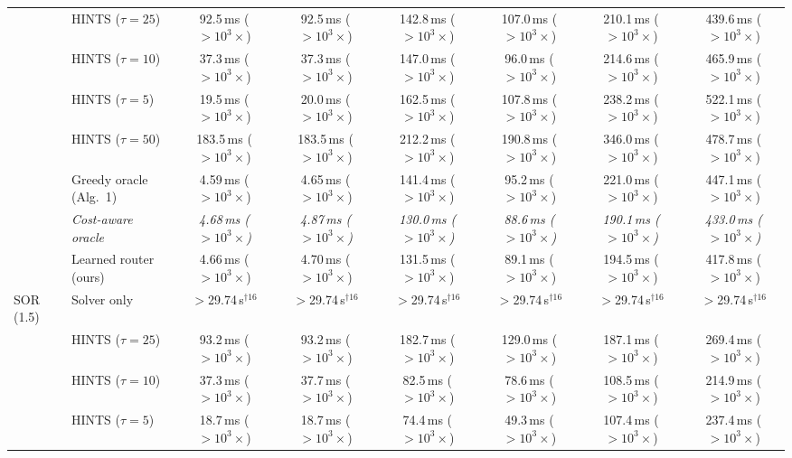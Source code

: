 {\begin{tabular}{llcccccc}
 & HINTS ($\tau{=}25$) & 92.5\,ms ($>10^{3}\times$) & 92.5\,ms ($>10^{3}\times$) & 142.8\,ms ($>10^{3}\times$) & 107.0\,ms ($>10^{3}\times$) & 210.1\,ms ($>10^{3}\times$) & 439.6\,ms ($>10^{3}\times$) \\
 & HINTS ($\tau{=}10$) & 37.3\,ms ($>10^{3}\times$) & 37.3\,ms ($>10^{3}\times$) & 147.0\,ms ($>10^{3}\times$) & 96.0\,ms ($>10^{3}\times$) & 214.6\,ms ($>10^{3}\times$) & 465.9\,ms ($>10^{3}\times$) \\
 & HINTS ($\tau{=}5$) & 19.5\,ms ($>10^{3}\times$) & 20.0\,ms ($>10^{3}\times$) & 162.5\,ms ($>10^{3}\times$) & 107.8\,ms ($>10^{3}\times$) & 238.2\,ms ($>10^{3}\times$) & 522.1\,ms ($>10^{3}\times$) \\
 & HINTS ($\tau{=}50$) & 183.5\,ms ($>10^{3}\times$) & 183.5\,ms ($>10^{3}\times$) & 212.2\,ms ($>10^{3}\times$) & 190.8\,ms ($>10^{3}\times$) & 346.0\,ms ($>10^{3}\times$) & 478.7\,ms ($>10^{3}\times$) \\
 & Greedy oracle (Alg.~1) & 4.59\,ms ($>10^{3}\times$) & 4.65\,ms ($>10^{3}\times$) & 141.4\,ms ($>10^{3}\times$) & 95.2\,ms ($>10^{3}\times$) & 221.0\,ms ($>10^{3}\times$) & 447.1\,ms ($>10^{3}\times$) \\
 & \textit{Cost-aware oracle} & \textit{4.68\,ms ($>10^{3}\times$)} & \textit{4.87\,ms ($>10^{3}\times$)} & \textit{130.0\,ms ($>10^{3}\times$)} & \textit{88.6\,ms ($>10^{3}\times$)} & \textit{190.1\,ms ($>10^{3}\times$)} & \textit{433.0\,ms ($>10^{3}\times$)} \\
 & Learned router (ours) & 4.66\,ms ($>10^{3}\times$) & 4.70\,ms ($>10^{3}\times$) & 131.5\,ms ($>10^{3}\times$) & 89.1\,ms ($>10^{3}\times$) & 194.5\,ms ($>10^{3}\times$) & 417.8\,ms ($>10^{3}\times$) \\
\midrule
SOR (1.5) & Solver only & $>$29.74\,s$^{\dagger 16}$ & $>$29.74\,s$^{\dagger 16}$ & $>$29.74\,s$^{\dagger 16}$ & $>$29.74\,s$^{\dagger 16}$ & $>$29.74\,s$^{\dagger 16}$ & $>$29.74\,s$^{\dagger 16}$ \\
 & HINTS ($\tau{=}25$) & 93.2\,ms ($>10^{3}\times$) & 93.2\,ms ($>10^{3}\times$) & 182.7\,ms ($>10^{3}\times$) & 129.0\,ms ($>10^{3}\times$) & 187.1\,ms ($>10^{3}\times$) & 269.4\,ms ($>10^{3}\times$) \\
 & HINTS ($\tau{=}10$) & 37.3\,ms ($>10^{3}\times$) & 37.7\,ms ($>10^{3}\times$) & 82.5\,ms ($>10^{3}\times$) & 78.6\,ms ($>10^{3}\times$) & 108.5\,ms ($>10^{3}\times$) & 214.9\,ms ($>10^{3}\times$) \\
 & HINTS ($\tau{=}5$) & 18.7\,ms ($>10^{3}\times$) & 18.7\,ms ($>10^{3}\times$) & 74.4\,ms ($>10^{3}\times$) & 49.3\,ms ($>10^{3}\times$) & 107.4\,ms ($>10^{3}\times$) & 237.4\,ms ($>10^{3}\times$) \\

\end{tabular}}
